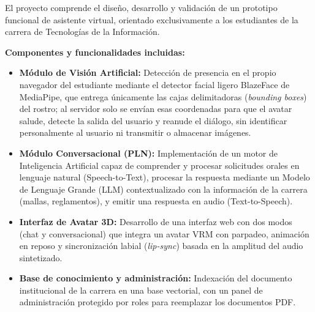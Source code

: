 El proyecto comprende el diseño, desarrollo y validación de un prototipo funcional de asistente virtual, orientado exclusivamente a los estudiantes de la carrera de Tecnologías de la Información.

\textbf{Componentes y funcionalidades incluidas:}
\begin{itemize}
    \item \textbf{Módulo de Visión Artificial:} Detección de presencia en el propio navegador del estudiante mediante el detector facial ligero BlazeFace de MediaPipe, que entrega únicamente las cajas delimitadoras (\textit{bounding boxes}) del rostro; al servidor solo se envían esas coordenadas para que el avatar salude, detecte la salida del usuario y reanude el diálogo, sin identificar personalmente al usuario ni transmitir o almacenar imágenes.
    \item \textbf{Módulo Conversacional (PLN):} Implementación de un motor de Inteligencia Artificial capaz de comprender y procesar solicitudes orales en lenguaje natural (Speech-to-Text), procesar la respuesta mediante un Modelo de Lenguaje Grande (LLM) contextualizado con la información de la carrera (mallas, reglamentos), y emitir una respuesta en audio (Text-to-Speech).
    \item \textbf{Interfaz de Avatar 3D:} Desarrollo de una interfaz web con dos modos (chat y conversacional) que integra un avatar VRM con parpadeo, animación en reposo y sincronización labial (\textit{lip-sync}) basada en la amplitud del audio sintetizado.
    \item \textbf{Base de conocimiento y administración:} Indexación del documento institucional de la carrera en una base vectorial, con un panel de administración protegido por roles para reemplazar los documentos PDF.
\end{itemize}

